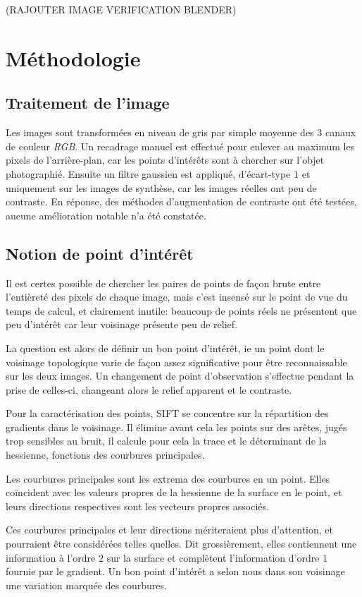 \documentclass[
	a4paper, %
	10pt, %
	unnumberedsections, %
	twoside, %
]{LTJournalArticle}
\begin{document}
(RAJOUTER IMAGE VERIFICATION BLENDER)

\section{Méthodologie}

\subsection{Traitement de l'image}
Les images sont transformées en niveau de gris par simple moyenne des $3$ canaux de couleur \textit{RGB}.
Un recadrage manuel est effectué pour enlever au maximum les pixels de l'arrière-plan, car les points
d'intérêts sont à chercher sur l'objet photographié. Ensuite un filtre gaussien est
appliqué, d'écart-type $1$ et uniquement sur les images de synthèse, car les images réelles
ont peu de contraste. En réponse, des méthodes d'augmentation
de contraste ont été testées, aucune amélioration notable n'a été constatée.


\subsection{Notion de point d'intérêt}

Il est certes possible de chercher les paires de points de façon brute entre
l'entièreté des pixels de chaque image, mais c'est insensé sur le
point de vue du temps de calcul, et clairement inutile: beaucoup de
points réels ne présentent que peu d'intérêt car leur voisinage présente
peu de relief.

La question est alors de définir un bon point
d'intérêt, ie un point dont le voisinage topologique varie de façon
assez significative pour être reconnaissable sur les deux images.
Un changement de point d'observation s'effectue pendant
la prise de celles-ci, changeant alors le relief apparent et le contraste.

Pour la caractérisation des points, SIFT se concentre sur la répartition des gradients
dans le voisinage. Il élimine avant cela les points sur des arêtes, jugés trop
sensibles au bruit, il calcule pour cela la trace et le déterminant
de la hessienne, fonctions des courbures principales.

Les courbures principales sont les extrema des courbures en un point.
Elles coïncident avec les valeurs propres de la hessienne de la surface en le point,
et leurs directions respectives sont les vecteurs propres associés.

Ces courbures principales et leur directions mériteraient plus d'attention,
et pourraient être considérées telles quelles. Dit grossièrement,
elles contiennent une information à l'ordre $2$ sur la surface et complètent
l'information d'ordre $1$ fournie par le gradient. Un bon
point d'intérêt a selon nous dans son voisinage une variation marquée des courbures.
\end{document}
